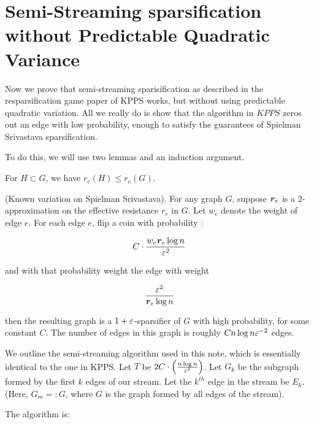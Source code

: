 \section{Semi-Streaming sparsification without Predictable Quadratic
  Variance}

Now we prove that semi-streaming sparisification as described in the
resparsification game paper of KPPS works, but without using predictable
quadratic variation. All we really do is show that the algorithm in
$KPPS$ zeros out an edge with low probability, enough to satisfy the
guarantees of Spielman Srivastava sparsification.

To do this, we will use two lemmas and an induction argument.

\begin{lemma}
For $H \subset G$, we have $r_e(H) \leq r_e(G)$.
\end{lemma}

\begin{lemma}
(Known variation on Spielman Srivastava).
For any graph $G$, suppose $\boldsymbol{\mathit{r}}_e$ is a $2$-approximation on the
effective resistance $r_e$ in $G$. Let $w_e$ denote the weight of edge
$e$. For each edge $e$, flip a coin with probability :

\begin{align}
C \cdot \frac{w_e \boldsymbol{\mathit{r}}_e \log n}{\varepsilon^2}
\end{align}

and with that probability weight the edge with weight

\begin{align}
\frac{\varepsilon^2}{\boldsymbol{\mathit{r}}_e \log n}
\end{align}

then the resulting graph is a $1+\varepsilon$-sparsifier of $G$ with high probability,
     for some constant $C$. The number of edges in this graph is roughly
     $C n \log n \varepsilon^{-2}$ edges.
\end{lemma}

We outline the semi-streaming algorithm used in this note,  which is essentially identical
to the one in KPPS. Let $T$ be $2C \cdot \left(\frac{n \log n}{\varepsilon^2}\right)$.  
Let $G_k$ be the subgraph formed by the first $k$ edges of our stream.
Let the $k^{th}$ edge in the stream be $E_k$.
(Here, $G_m =:G$, where $G$ is the graph formed by all edges of the
 stream).

The algorithm is:

